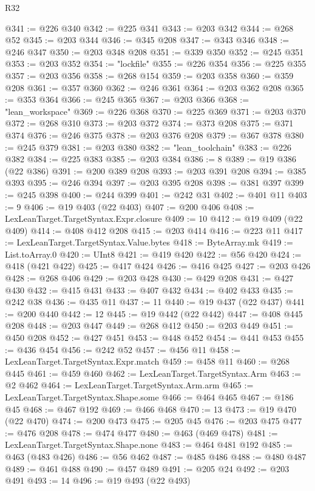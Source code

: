 \begin{lexlean}{R32}
\begin{coremodule}
@341 := @226 @340
@342 := @225 @341
@343 := @203 @342
@344 := @268 @52
@345 := @203 @344
@346 := @345 @208
@347 := @343 @346
@348 := @246 @347
@350 := @203 @348 @208
@351 := @339 @350
@352 := @245 @351
@353 := @203 @352
@354 := "lockfile"
@355 := @226 @354
@356 := @225 @355
@357 := @203 @356
@358 := @268 @154
@359 := @203 @358
@360 := @359 @208
@361 := @357 @360
@362 := @246 @361
@364 := @203 @362 @208
@365 := @353 @364
@366 := @245 @365
@367 := @203 @366
@368 := "lean_workspace"
@369 := @226 @368
@370 := @225 @369
@371 := @203 @370
@372 := @268 @310
@373 := @203 @372
@374 := @373 @208
@375 := @371 @374
@376 := @246 @375
@378 := @203 @376 @208
@379 := @367 @378
@380 := @245 @379
@381 := @203 @380
@382 := "lean_toolchain"
@383 := @226 @382
@384 := @225 @383
@385 := @203 @384
@386 := 8
@389 := @19 @386 (@22 @386)
@391 := @200 @389 @208
@393 := @203 @391 @208
@394 := @385 @393
@395 := @246 @394
@397 := @203 @395 @208
@398 := @381 @397
@399 := @245 @398
@400 := @244 @399
@401 := @242 @31
@402 := @401 @11
@403 := 9
@406 := @19 @403 (@22 @403)
@407 := @200 @406
@408 := LexLeanTarget.TargetSyntax.Expr.closure
@409 := 10
@412 := @19 @409 (@22 @409)
@414 := @408 @412 @208
@415 := @203 @414
@416 := @223 @11
@417 := LexLeanTarget.TargetSyntax.Value.bytes
@418 := ByteArray.mk
@419 := List.toArray.{0}
@420 := UInt8
@421 := @419 @420
@422 := @56 @420
@424 := @418 (@421 @422)
@425 := @417 @424
@426 := @416 @425
@427 := @203 @426
@428 := @268 @406
@429 := @203 @428
@430 := @429 @208
@431 := @427 @430
@432 := @415 @431
@433 := @407 @432
@434 := @402 @433
@435 := @242 @38
@436 := @435 @11
@437 := 11
@440 := @19 @437 (@22 @437)
@441 := @200 @440
@442 := 12
@445 := @19 @442 (@22 @442)
@447 := @408 @445 @208
@448 := @203 @447
@449 := @268 @412
@450 := @203 @449
@451 := @450 @208
@452 := @427 @451
@453 := @448 @452
@454 := @441 @453
@455 := @436 @454
@456 := @242 @52
@457 := @456 @11
@458 := LexLeanTarget.TargetSyntax.Expr.match
@459 := @458 @11
@460 := @268 @445
@461 := @459 @460
@462 := LexLeanTarget.TargetSyntax.Arm
@463 := @2 @462
@464 := LexLeanTarget.TargetSyntax.Arm.arm
@465 := LexLeanTarget.TargetSyntax.Shape.some
@466 := @464 @465
@467 := @186 @45
@468 := @467 @192
@469 := @466 @468
@470 := 13
@473 := @19 @470 (@22 @470)
@474 := @200 @473
@475 := @205 @45
@476 := @203 @475
@477 := @476 @208
@478 := @474 @477
@480 := @463 (@469 @478)
@481 := LexLeanTarget.TargetSyntax.Shape.none
@483 := @464 @481 @192
@485 := @463 (@483 @426)
@486 := @56 @462
@487 := @485 @486
@488 := @480 @487
@489 := @461 @488
@490 := @457 @489
@491 := @205 @24
@492 := @203 @491
@493 := 14
@496 := @19 @493 (@22 @493)

\end{coremodule}
\end{lexlean}
